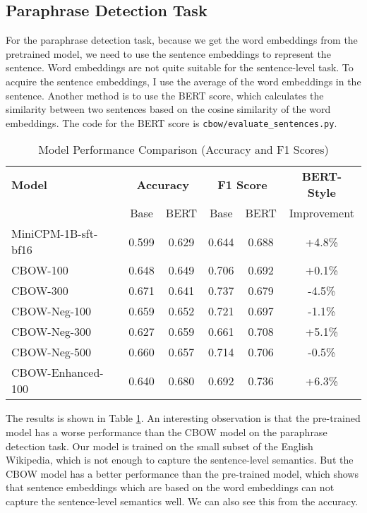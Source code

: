 \documentclass[UTF8,a4paper,12pt]{article}
\begin{document}
\subsection{Paraphrase Detection Task}

For the paraphrase detection task, because we get the word embeddings from the pretrained model, we need to use the sentence embeddings to represent the sentence. Word embeddings are not quite suitable for the sentence-level task. To acquire the sentence embeddings, I use the average of the word embeddings in the sentence. Another method is to use the BERT score, which calculates the similarity between two sentences based on the cosine similarity of the word embeddings. The code for the BERT score is \texttt{cbow/evaluate\_sentences.py}.

\begin{table}[htbp]
    \centering
    \caption{\quad Model Performance Comparison (Accuracy and F1 Scores)}
    \label{tab:model_results}
    \begin{tabular}{lccccc}
    \toprule
    \textbf{Model} & \multicolumn{2}{c}{\textbf{Accuracy}} & \multicolumn{2}{c}{\textbf{F1 Score}} & \textbf{BERT-Style} \\
    \cmidrule(lr){2-3} \cmidrule(lr){4-5} \cmidrule(lr){6-6}
     & Base & BERT & Base & BERT & Improvement \\ 
    \midrule
    MiniCPM-1B-sft-bf16 & 0.599 & 0.629 & 0.644 & 0.688 & +4.8\% \\
    CBOW-100 & 0.648 & 0.649 & 0.706 & 0.692 & +0.1\% \\
    CBOW-300 & 0.671 & 0.641 & 0.737 & 0.679 & -4.5\% \\
    CBOW-Neg-100 & 0.659 & 0.652 & 0.721 & 0.697 & -1.1\% \\
    CBOW-Neg-300 & 0.627 & 0.659 & 0.661 & 0.708 & +5.1\% \\
    CBOW-Neg-500 & 0.660 & 0.657 & 0.714 & 0.706 & -0.5\% \\
    CBOW-Enhanced-100 & 0.640 & 0.680 & 0.692 & 0.736 & +6.3\% \\
    \bottomrule
    \end{tabular}
\end{table}

The results is shown in Table \ref{tab:model_results}. An interesting observation is that the pre-trained model has a worse performance than the CBOW model on the paraphrase detection task. Our model is trained on the small subset of the English Wikipedia, which is not enough to capture the sentence-level semantics. But the CBOW model has a better performance than the pre-trained model, which shows that sentence embeddings which are based on the word embeddings can not capture the sentence-level semantics well. We can also see this from the accuracy.
\end{document}
